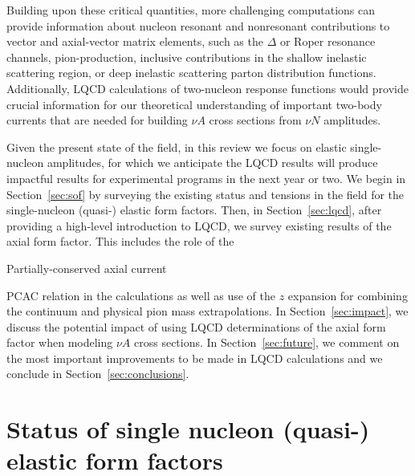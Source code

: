\documentclass{ar-1col}
\def\asm#1{{\color{blue}#1}}
\def\del#1{}
\begin{document}
Building upon these critical quantities, more challenging computations can provide information about nucleon
resonant and nonresonant contributions to vector and axial-vector matrix elements,
such as the $\Delta$ or Roper resonance channels, pion-production,
inclusive contributions in the shallow inelastic scattering region,
or deep inelastic scattering parton distribution functions.
Additionally, \asm{LQCD calculations of} two-nucleon response functions \del{can be computed which can}\asm{would} provide crucial information for our theoretical understanding of important two-body currents \asm{that}\del{which} are needed for \asm{building}\del{understanding the} $\nu A$ cross sections \asm{from $\nu N$ amplitudes}.

Given the present state of the field, in this review\del{,} we focus on elastic single-nucleon amplitudes, \del{in}\asm{for} which we anticipate the LQCD results will \asm{produce}\del{become} impactful \asm{results} for \del{the }experimental programs in the next year or two.
We begin in Section~\ref{sec:sof} by surveying the existing status and tension\asm{s} in the field for the single-nucleon (quasi-) elastic form factors.
Then, in Section~\ref{sec:lqcd}, after providing a high-level introduction to LQCD, we survey existing results of the axial form factor\asm{. This} includ\asm{es}\del{ing} the role of the%
\begin{marginnote}
  {Partially-conserved} axial current
\end{marginnote}%
PCAC relation in the calculations as well as use of the $z$ expansion for combining the continuum and physical pion mass extrapolations.
In Section~\ref{sec:impact}, we discuss the potential impact of using LQCD determinations of the axial form factor when modeling $\nu A$ cross sections.
In Section~\ref{sec:future}, we comment on the most important improvements to be made in LQCD calculations and we conclude in Section~\ref{sec:conclusions}.


\section{Status of single nucleon (quasi-) elastic form factors\label{sec:sof}}
\end{document}
